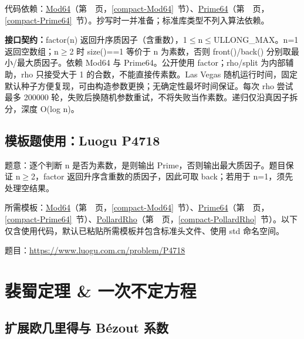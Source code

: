 代码依赖：\hyperref[compact-Mod64]{Mod64}（第~\pageref{compact-Mod64}~页，\ref{compact-Mod64}~节）、\hyperref[compact-Prime64]{Prime64}（第~\pageref{compact-Prime64}~页，\ref{compact-Prime64}~节）。抄写时一并准备；标准库类型不列入算法依赖。

{\sloppy{}\noindent\textbf{接口契约：}factor(n) 返回升序质因子（含重数），1$\le$n$\le$ULLONG\_MAX。n=1 返回空数组；n$\ge$2 时 size()==1 等价于 n 为素数，否则 front()/back() 分别取最小/最大质因子。依赖 Mod64 与 Prime64。公开使用 factor；rho/split 为内部辅助，rho 只接受大于 1 的合数，不能直接传素数。Las Vegas 随机运行时间，固定默认种子方便复现，可由构造参数更换；无确定性最坏时间保证。每次 rho 尝试最多 200000 轮，失败后换随机参数重试，不将失败当作素数。递归仅沿真因子拆分，深度 O(log n)。\par}



\Needspace{356pt}

\subsection*{模板题使用：Luogu P4718}

\label{usage-example-43}

题意：逐个判断 n 是否为素数，是则输出 Prime，否则输出最大质因子。题目保证 n$\ge$2，factor 返回升序含重数的质因子，因此可取 back；若用于 n=1，须先处理空结果。

所需模板：\hyperref[compact-Mod64]{Mod64}（第~\pageref{compact-Mod64}~页，\ref{compact-Mod64}~节）、\hyperref[compact-Prime64]{Prime64}（第~\pageref{compact-Prime64}~页，\ref{compact-Prime64}~节）、\hyperref[compact-PollardRho]{PollardRho}（第~\pageref{compact-PollardRho}~页，\ref{compact-PollardRho}~节）。以下仅含使用代码，默认已粘贴所需模板并包含标准头文件、使用 std 命名空间。

题目：\url{https://www.luogu.com.cn/problem/P4718}



\Needspace{399pt}

\section{裴蜀定理 \& 一次不定方程}

\subsection{扩展欧几里得与 Bézout 系数}\label{compact-extended_gcd}

